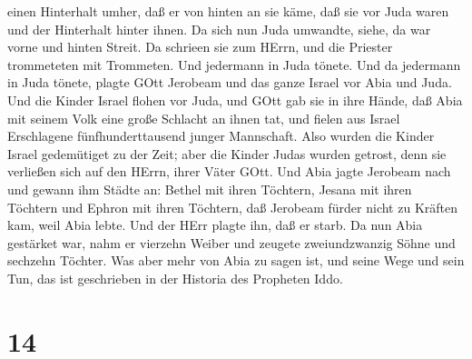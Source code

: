 einen Hinterhalt umher, daß er von hinten an sie käme, daß sie vor Juda
waren und der Hinterhalt hinter ihnen.  Da sich nun Juda
umwandte, siehe, da war vorne und hinten Streit. Da schrieen sie zum
HErrn, und die Priester trommeteten mit Trommeten.  Und
jedermann in Juda tönete. Und da jedermann in Juda tönete, plagte GOtt
Jerobeam und das ganze Israel vor Abia und Juda.  Und die
Kinder Israel flohen vor Juda, und GOtt gab sie in ihre Hände,
 daß Abia mit seinem Volk eine große Schlacht an ihnen tat,
und fielen aus Israel Erschlagene fünfhunderttausend junger Mannschaft.
 Also wurden die Kinder Israel gedemütiget zu der Zeit;
aber die Kinder Judas wurden getrost, denn sie verließen sich auf den
HErrn, ihrer Väter GOtt.  Und Abia jagte Jerobeam nach und
gewann ihm Städte an: Bethel mit ihren Töchtern, Jesana mit ihren
Töchtern und Ephron mit ihren Töchtern,  daß Jerobeam
fürder nicht zu Kräften kam, weil Abia lebte. Und der HErr plagte ihn,
daß er starb.  Da nun Abia gestärket war, nahm er vierzehn
Weiber und zeugete zweiundzwanzig Söhne und sechzehn Töchter.
 Was aber mehr von Abia zu sagen ist, und seine Wege und
sein Tun, das ist geschrieben in der Historia des Propheten Iddo.

\hypertarget{section-13}{%
\section{14}\label{section-13}}

